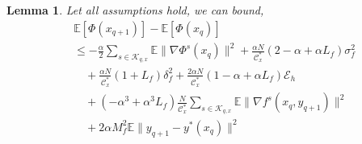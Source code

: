\documentclass[lettersize,journal]{IEEEtran}
\newtheorem{lemma}{Lemma}
\begin{document}
\begin{lemma}
    Let all assumptions hold, we can bound,
    \begin{align}
&\mathbb{E}\left[\Phi(x_{q+1})\right]-\mathbb{E}\left[\Phi(x_q)\right]\\
&\leq-\frac{\alpha}{2}\sum_{s\in \mathcal{K}_{q,x}}\mathbb{E}\|\nabla \Phi^s(x_{q})\|^2+\frac{\alpha N}{\mathcal{C}_x^*}(2-\alpha+\alpha L_f)\sigma_f^2\nonumber\\
&\quad+\frac{\alpha N}{\mathcal{C}_x^*}(1+L_f)\delta^2_f+\frac{2\alpha N}{\mathcal{C}_x^*}(1-\alpha+\alpha L_f)\mathcal{E}_h\nonumber\\
&\quad+(-\alpha^3+\alpha^3 L_f)\frac{N}{\mathcal{C}_x^*}\sum_{s\in \mathcal{K}_{q,x}}\mathbb{E}\|\nabla f^s(x_{q},y_{q+1})\|^2\nonumber\\
&\quad+2\alpha M_f^2\mathbb{E}\|y_{q+1}-y^*(x_q)\|^2\nonumber
\end{align}
\end{lemma}
\end{document}
